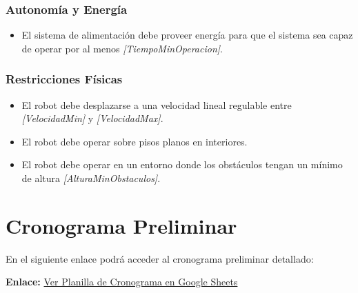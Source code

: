 \documentclass[12pt,a4paper]{article}
\begin{document}
\subsubsection{Autonomía y Energía}
\begin{itemize}
    \item El sistema de alimentación debe proveer energía para que el sistema sea capaz de operar por al menos \textit{[TiempoMinOperacion]}.
\end{itemize}

\subsubsection{Restricciones Físicas}
\begin{itemize}
    \item El robot debe desplazarse a una velocidad lineal regulable entre \textit{[VelocidadMin]} y \textit{[VelocidadMax]}.
    \item El robot debe operar sobre pisos planos en interiores.
    \item El robot debe operar en un entorno donde los obstáculos tengan un mínimo de altura \textit{[AlturaMinObstaculos]}.
\end{itemize}


\section{Cronograma Preliminar}

\begin{tcolorbox}[colframe=green!60!black, colback=green!5!white, arc=2mm, title=\textbf{Cronograma (Google Sheets)}]
  En el siguiente enlace podrá acceder al cronograma preliminar detallado:
  \vspace{0.2cm}

  \textbf{Enlace:} \href{https://docs.google.com/spreadsheets/d/1GAEeQZzlFaMgwrWLOeSPeK0nOuYQg2peXEuDazYDfk4/edit?usp=sharing}{Ver Planilla de Cronograma en Google Sheets}
\end{tcolorbox}
\end{document}
